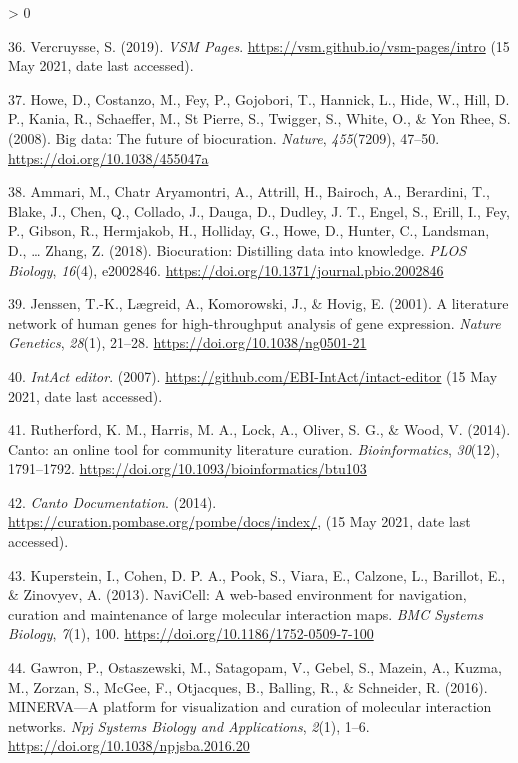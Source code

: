 \documentclass[
  12pt,
]{book}
\newlength{\cslhangindent}
\newenvironment{CSLReferences}[2] %
 {%
  \setlength{\parindent}{0pt}
  \ifodd #1 \everypar{\setlength{\hangindent}{\cslhangindent}}\ignorespaces\fi
  \ifnum #2 > 0
  \setlength{\parskip}{#2\baselineskip}
  \fi
 }%
 {}
\begin{document}
\begin{CSLReferences}{1}{0}
\leavevmode\hypertarget{ref-Vercruysse2019a}{}%
36. Vercruysse, S. (2019). \emph{{VSM Pages}}. \url{https://vsm.github.io/vsm-pages/intro} (15 May 2021, date last accessed).

\leavevmode\hypertarget{ref-Howe2008}{}%
37. Howe, D., Costanzo, M., Fey, P., Gojobori, T., Hannick, L., Hide, W., Hill, D. P., Kania, R., Schaeffer, M., St Pierre, S., Twigger, S., White, O., \& Yon Rhee, S. (2008). {Big data: The future of biocuration}. \emph{Nature}, \emph{455}(7209), 47--50. \url{https://doi.org/10.1038/455047a}

\leavevmode\hypertarget{ref-Ammari2018}{}%
38. Ammari, M., Chatr Aryamontri, A., Attrill, H., Bairoch, A., Berardini, T., Blake, J., Chen, Q., Collado, J., Dauga, D., Dudley, J. T., Engel, S., Erill, I., Fey, P., Gibson, R., Hermjakob, H., Holliday, G., Howe, D., Hunter, C., Landsman, D., \ldots{} Zhang, Z. (2018). {Biocuration: Distilling data into knowledge}. \emph{PLOS Biology}, \emph{16}(4), e2002846. \url{https://doi.org/10.1371/journal.pbio.2002846}

\leavevmode\hypertarget{ref-Jenssen2001}{}%
39. Jenssen, T.-K., Lægreid, A., Komorowski, J., \& Hovig, E. (2001). {A literature network of human genes for high-throughput analysis of gene expression}. \emph{Nature Genetics}, \emph{28}(1), 21--28. \url{https://doi.org/10.1038/ng0501-21}

\leavevmode\hypertarget{ref-intact-editor}{}%
40. \emph{{IntAct editor}}. (2007). \url{https://github.com/EBI-IntAct/intact-editor} (15 May 2021, date last accessed).

\leavevmode\hypertarget{ref-Rutherford2014}{}%
41. Rutherford, K. M., Harris, M. A., Lock, A., Oliver, S. G., \& Wood, V. (2014). {Canto: an online tool for community literature curation}. \emph{Bioinformatics}, \emph{30}(12), 1791--1792. \url{https://doi.org/10.1093/bioinformatics/btu103}

\leavevmode\hypertarget{ref-canto-doc}{}%
42. \emph{{Canto Documentation}}. (2014). \url{https://curation.pombase.org/pombe/docs/index/}, (15 May 2021, date last accessed).

\leavevmode\hypertarget{ref-Kuperstein2013}{}%
43. Kuperstein, I., Cohen, D. P. A., Pook, S., Viara, E., Calzone, L., Barillot, E., \& Zinovyev, A. (2013). {NaviCell: A web-based environment for navigation, curation and maintenance of large molecular interaction maps}. \emph{BMC Systems Biology}, \emph{7}(1), 100. \url{https://doi.org/10.1186/1752-0509-7-100}

\leavevmode\hypertarget{ref-Gawron2016}{}%
44. Gawron, P., Ostaszewski, M., Satagopam, V., Gebel, S., Mazein, A., Kuzma, M., Zorzan, S., McGee, F., Otjacques, B., Balling, R., \& Schneider, R. (2016). {MINERVA---A platform for visualization and curation of molecular interaction networks}. \emph{Npj Systems Biology and Applications}, \emph{2}(1), 1--6. \url{https://doi.org/10.1038/npjsba.2016.20}


\end{CSLReferences}
\end{document}
